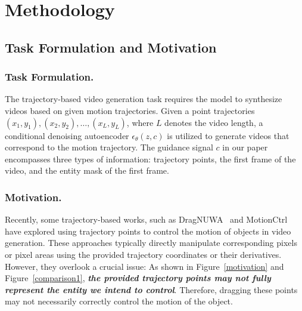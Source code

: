 \documentclass[runningheads]{llncs}
\newcommand{\model}{\epsilon_\theta}
\begin{document}



\section{Methodology}

%
%


\subsection{Task Formulation and Motivation}
\label{Taskmotivation} 




\subsubsection{Task Formulation.} The trajectory-based video generation task requires the model to synthesize videos based on given motion trajectories.
%
Given a point trajectories ${(x_1, y_1), (x_2, y_2), \dots, (x_L, y_L)}$, where $L$ denotes the video length, a conditional denoising autoencoder $\model(z , c)$ is utilized to generate videos that correspond to the motion trajectory.
%
The guidance signal $c$ in our paper encompasses three types of information: trajectory points, the first frame of the video, and the entity mask of the first frame.
%


 \subsubsection{Motivation.} Recently, some trajectory-based works, such as DragNUWA~\cite{yin2023dragnuwa} and MotionCtrl~\cite{wang2023motionctrl} have explored using trajectory points to control the motion of objects in video generation.
 These approaches typically directly manipulate corresponding pixels or pixel areas using the provided trajectory coordinates or their derivatives. 
 However, they overlook a crucial issue:
 As shown in Figure~\ref{motivation} and Figure~\ref{comparison1}, \textit{\textbf{the provided trajectory points may not fully represent the entity we intend to control}}.
 Therefore, dragging these points may not necessarily correctly control the motion of the object.
\end{document}
